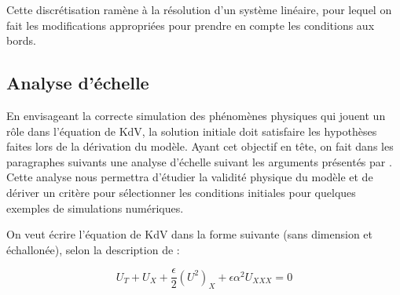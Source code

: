 \indent Cette discrétisation ramène à la résolution d'un système linéaire, pour lequel on fait les modifications appropriées pour prendre en compte les conditions aux bords.

%
%
%
%
%
%
%

\subsection{Analyse d'échelle}

\indent En envisageant la correcte simulation des phénomènes physiques qui jouent un rôle dans l'équation de KdV, la solution initiale doit satisfaire les hypothèses faites lors de la dérivation du modèle. Ayant cet objectif en tête, on fait dans les paragraphes suivants une analyse d'échelle suivant les arguments présentés par \cite{BBM1971}. Cette analyse nous permettra d'étudier la validité physique du modèle et de dériver un critère pour sélectionner les conditions initiales pour quelques exemples de simulations numériques.

\indent On veut écrire l'équation de KdV dans la forme suivante (sans dimension et échallonée), selon la description de \cite{BBM1971} :

\begin{equation}
\label{eq:scaledKdV}
U_T + U_X + \frac{\epsilon}{2} (U^2)_X + \epsilon\alpha^2U_{XXX} = 0
\end{equation}

